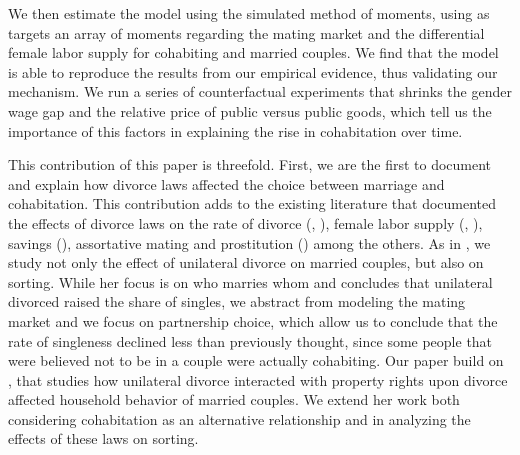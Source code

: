 \documentclass[12pt]{article}
\numberwithin{table}{section}
\begin{document}
We then estimate the model using the simulated method of moments, using as targets an array of moments regarding the mating market and the differential female labor supply for cohabiting and married couples. We find that the model is able to reproduce the results from our empirical evidence, thus validating our mechanism. We run a series of counterfactual experiments that shrinks the gender wage gap and the relative price of public versus public goods, which tell us the importance of this factors in explaining the rise in cohabitation over time.

This contribution of this paper is threefold. First, we are the first to document and explain how divorce laws affected the choice between marriage and cohabitation. This contribution adds to the existing literature that documented the effects of divorce laws on the rate of divorce (\cite{friedberg1998}, \cite{wolfers2006}), female labor supply (\cite{stevenson2008}, \cite{voena2015}), savings (\cite{voena2015}), assortative mating \cite{reynoso2019} and prostitution (\cite{ciacci2017}) among the others. As in \cite{reynoso2019}, we study not only the effect of unilateral divorce on married couples, but also on sorting. While her focus is on who marries whom and concludes that unilateral divorced raised the share of singles, we abstract from modeling the mating market and we focus on partnership choice, which allow us to conclude that the rate of singleness declined less than previously thought, since some people that were believed not to be in a couple were actually cohabiting. Our paper build on \cite{voena2015}, that studies how unilateral divorce interacted with property rights upon divorce affected household behavior of married couples. We extend her work both considering cohabitation as an alternative relationship and in analyzing the effects of these laws on sorting.
\end{document}
